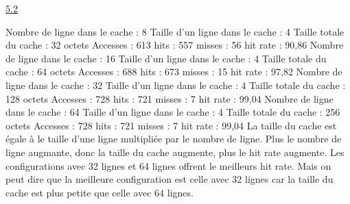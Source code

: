 \documentclass[a4paper,12pt]{article}
\begin{document}
	\underline{5.2}\\
		\par
		Nombre de ligne dans le cache : 8
		Taille d'un ligne dans le cache : 4
		Taille totale du cache : 32 octets
			Accesses : 613
			hits : 557
			misses : 56
			hit rate : 90,86%
		Nombre de ligne dans le cache : 16
		Taille d'un ligne dans le cache : 4
		Taille totale du cache : 64 octets
			Accesses : 688
			hits : 673
			misses : 15
			hit rate : 97,82%
		Nombre de ligne dans le cache : 32
		Taille d'un ligne dans le cache : 4
		Taille totale du cache : 128 octets
			Accesses : 728
			hits : 721
			misses : 7
			hit rate : 99,04%
		Nombre de ligne dans le cache : 64
		Taille d'un ligne dans le cache : 4
		Taille totale du cache : 256 octets
			Accesses : 728
			hits : 721
			misses : 7
			hit rate : 99,04%
		La taille du cache est égale à le taille d'une ligne multipliée par le nombre de ligne.
		Plus le nombre de ligne augmante, donc la taille du cache augmente, plus le hit rate augmente.
		Les configurations avec 32 lignes et 64 lignes offrent le meilleurs hit rate. Mais on peut dire que la meilleure configuration est celle avec 32 lignes car la taille du cache est plus petite que celle avec 64 lignes.
\end{document}
